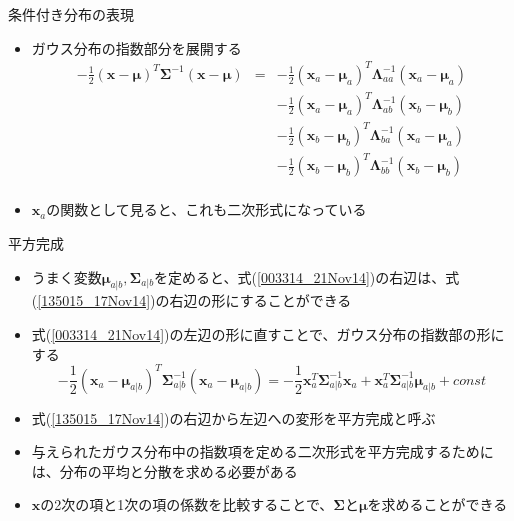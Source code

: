 \begin{frame}{条件付き分布の表現}
 \begin{itemize}
  \item ガウス分布の指数部分を展開する
        \begin{eqnarray}
         -\frac{1}{2}(\bm{x} - \bm{\mu})^{T}\bm{\Sigma}^{-1}(\bm{x}-\bm{\mu}) &= &
          -\frac{1}{2}(\bm{x}_a - \bm{\mu}_a)^{T}\bm{\Lambda}_{aa}^{-1}(\bm{x}_a-\bm{\mu}_a) \nonumber \\
         &&-\frac{1}{2}(\bm{x}_a - \bm{\mu}_a)^{T}\bm{\Lambda}_{ab}^{-1}(\bm{x}_b-\bm{\mu}_b) \nonumber \\
         &&-\frac{1}{2}(\bm{x}_b - \bm{\mu}_b)^{T}\bm{\Lambda}_{ba}^{-1}(\bm{x}_a-\bm{\mu}_a) \nonumber \\
         &&-\frac{1}{2}(\bm{x}_b - \bm{\mu}_b)^{T}\bm{\Lambda}_{bb}^{-1}(\bm{x}_b-\bm{\mu}_b) \nonumber \\
         &&\label{003314_21Nov14}
        \end{eqnarray}
  \item $\bm{x}_a$の関数として見ると、これも\alert{二次形式}になっている
 \end{itemize}
\end{frame}

\begin{frame}{平方完成}
 \begin{itemize}
  \item うまく変数$\bm{\mu}_{a|b},\bm{\Sigma}_{a|b}$を定めると、式(\ref{003314_21Nov14})の右辺は、式(\ref{135015_17Nov14})の右辺の形にすることができる
  \item 式(\ref{003314_21Nov14})の左辺の形に直すことで、ガウス分布の指数部の形にする
        \begin{equation}
         -\frac{1}{2}(\bm{x}_a-\bm{\mu}_{a|b})^{T}\bm{\Sigma}_{a|b}^{-1}(\bm{x}_a-\bm{\mu}_{a|b}) = -\frac{1}{2}\bm{x}_a^T\bm{\Sigma}_{a|b}^{-1}\bm{x}_a+\bm{x}_a^T\bm{\Sigma}_{a|b}^{-1}\bm{\mu}_{a|b} + const\label{135015_17Nov14}
        \end{equation}
  \item 式(\ref{135015_17Nov14})の右辺から左辺への変形を\alert{平方完成}と呼ぶ

  \item 与えられたガウス分布中の指数項を定める二次形式を平方完成するためには、分布の平均と分散を求める必要がある
  \item $\bm{x}$の2次の項と1次の項の係数を比較することで、$\bm{\Sigma}$と$\bm{\mu}$を求めることができる
 \end{itemize}
\end{frame}

